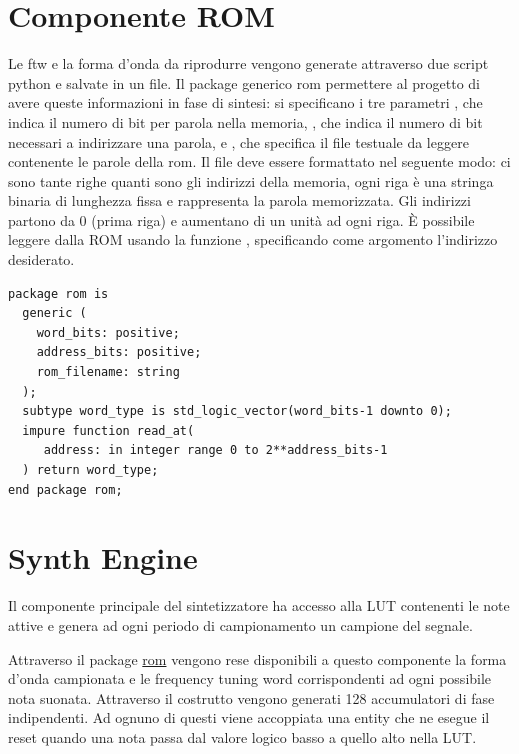 \section{Componente ROM}
\label{sec:rom}
Le ftw e la forma d'onda da riprodurre vengono generate attraverso due
script python e salvate in un file.
Il package generico rom permettere al progetto di avere queste informazioni in fase di sintesi: si specificano i tre parametri , che indica il numero di bit per parola nella memoria, , che indica il numero di bit necessari a indirizzare una parola, e , che specifica il file testuale da leggere contenente le parole della rom.
Il file deve essere formattato nel seguente modo: ci sono tante righe quanti sono gli indirizzi della memoria, ogni riga è una stringa binaria
di lunghezza fissa e rappresenta la parola memorizzata.
Gli indirizzi partono da 0 (prima riga) e aumentano di un unità ad ogni riga.
È possibile leggere dalla ROM usando la funzione , specificando come argomento l'indirizzo desiderato.

\begin{verbatim}
package rom is
  generic (
    word_bits: positive;
    address_bits: positive;
    rom_filename: string
  );
  subtype word_type is std_logic_vector(word_bits-1 downto 0);
  impure function read_at(
     address: in integer range 0 to 2**address_bits-1
  ) return word_type;
end package rom;
\end{verbatim}

\section{Synth Engine}
\label{sec:synthengine}

\begin{center}
\end{center}


Il componente principale del sintetizzatore ha accesso alla LUT contenenti le note attive e genera ad ogni periodo di campionamento
un campione del segnale.

Attraverso il package \hyperref[sec:rom]{rom} vengono rese disponibili a questo componente la forma d'onda campionata e le frequency
tuning word corrispondenti ad ogni possibile nota suonata.
Attraverso il costrutto  vengono generati 128 accumulatori di fase indipendenti. Ad ognuno di questi viene accoppiata
una entity che ne esegue il reset quando una nota passa dal valore logico basso a quello alto nella LUT.

